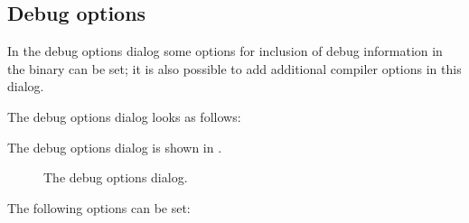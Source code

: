 \subsection{Debug options}
\label{se:debugoptions}
In the debug options dialog some options for inclusion of debug information
in the binary can be set; it is also possible to add additional compiler
options in this dialog.
\begin{htmlonly}
The debug options dialog looks as follows:
\end{htmlonly}
\begin{latexonly}
The debug options dialog is shown in .
\begin{figure}[ht]
\begin{center}
\caption{The debug options dialog.}\label{fig:odebug}
\ifpdf
{}
\else
{}
\fi
\end{center}
\end{figure}
\end{latexonly}
The following options can be set:
